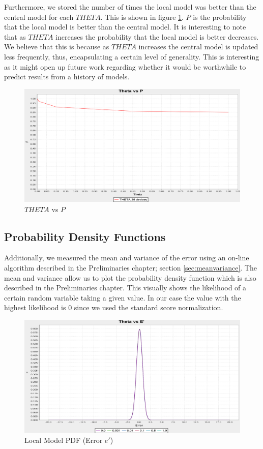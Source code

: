 \documentclass{mproj}
\begin{document}
Furthermore, we stored the number of times the local model was better than the central model for each $THETA$. This is shown in figure \ref{fig:thetaP}. $P$ is the probability that the local model is better than the central model. It is interesting to note that as $THETA$ increases the probability that the local model is better decreases. We believe that this is because as $THETA$ increases the central model is updated less frequently, thus, encapsulating a certain level of generality. This is interesting as it might open up future work regarding whether it would be worthwhile to predict results from a history of models.

\begin{figure}[H]
\caption{$THETA$ vs $P$}
\label{fig:thetaP}
\centerline{\includegraphics[scale=0.3]{thetaP}}
\end{figure}

\subsection{Probability Density Functions}
Additionally, we measured the mean and variance of the error using an on-line algorithm described in the Preliminaries chapter; section \ref{sec:meanvariance}. The mean and variance allow us to plot the probability density function which is also described in the Preliminaries chapter. This visually shows the likelihood of a certain random variable taking a given value. In our case the value with the highest likelihood is 0 since we used the standard score normalization.

\begin{figure}[H]
  \caption{Local Model PDF (Error $e'$)}
  \label{fig:thetaedash}
\centerline{\includegraphics[scale=0.3]{ThetaEDASH}}
\end{figure}
\end{document}
